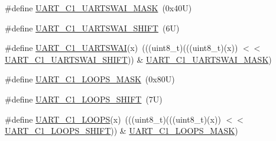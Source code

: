 \begin{DoxyCompactItemize}
\item 
\#define \mbox{\hyperlink{group___u_a_r_t___register___masks_ga466f5bf7b0cd3c3517da3a6c6a9baaac}{U\+A\+R\+T\+\_\+\+C1\+\_\+\+U\+A\+R\+T\+S\+W\+A\+I\+\_\+\+M\+A\+SK}}~(0x40\+U)
\item 
\#define \mbox{\hyperlink{group___u_a_r_t___register___masks_gac7888d995fd947613eea08bdee534ffc}{U\+A\+R\+T\+\_\+\+C1\+\_\+\+U\+A\+R\+T\+S\+W\+A\+I\+\_\+\+S\+H\+I\+FT}}~(6\+U)
\item 
\#define \mbox{\hyperlink{group___u_a_r_t___register___masks_ga24b2a5dabba09b799a98658f73767eca}{U\+A\+R\+T\+\_\+\+C1\+\_\+\+U\+A\+R\+T\+S\+W\+AI}}(x)~(((uint8\+\_\+t)(((uint8\+\_\+t)(x)) $<$$<$ \mbox{\hyperlink{group___u_a_r_t___register___masks_gac7888d995fd947613eea08bdee534ffc}{U\+A\+R\+T\+\_\+\+C1\+\_\+\+U\+A\+R\+T\+S\+W\+A\+I\+\_\+\+S\+H\+I\+FT}})) \& \mbox{\hyperlink{group___u_a_r_t___register___masks_ga466f5bf7b0cd3c3517da3a6c6a9baaac}{U\+A\+R\+T\+\_\+\+C1\+\_\+\+U\+A\+R\+T\+S\+W\+A\+I\+\_\+\+M\+A\+SK}})
\item 
\#define \mbox{\hyperlink{group___u_a_r_t___register___masks_ga08f1bbd905640d81967f9fb6d4ed8ec8}{U\+A\+R\+T\+\_\+\+C1\+\_\+\+L\+O\+O\+P\+S\+\_\+\+M\+A\+SK}}~(0x80\+U)
\item 
\#define \mbox{\hyperlink{group___u_a_r_t___register___masks_gac6beea8a7bad0b0fc3c3535f629fcf3a}{U\+A\+R\+T\+\_\+\+C1\+\_\+\+L\+O\+O\+P\+S\+\_\+\+S\+H\+I\+FT}}~(7\+U)
\item 
\#define \mbox{\hyperlink{group___u_a_r_t___register___masks_gaa1bea216b81e950a7517643e4c53f1b8}{U\+A\+R\+T\+\_\+\+C1\+\_\+\+L\+O\+O\+PS}}(x)~(((uint8\+\_\+t)(((uint8\+\_\+t)(x)) $<$$<$ \mbox{\hyperlink{group___u_a_r_t___register___masks_gac6beea8a7bad0b0fc3c3535f629fcf3a}{U\+A\+R\+T\+\_\+\+C1\+\_\+\+L\+O\+O\+P\+S\+\_\+\+S\+H\+I\+FT}})) \& \mbox{\hyperlink{group___u_a_r_t___register___masks_ga08f1bbd905640d81967f9fb6d4ed8ec8}{U\+A\+R\+T\+\_\+\+C1\+\_\+\+L\+O\+O\+P\+S\+\_\+\+M\+A\+SK}})
\end{DoxyCompactItemize}

